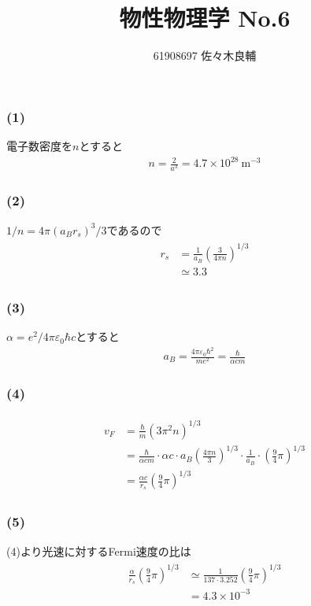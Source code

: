 \documentclass[uplatex,a4j,11pt,dvipdfmx]{jsarticle}
\begin{document}
\title{物性物理学 No.6}
\author{61908697 佐々木良輔}
\date{}
\maketitle
\subsubsection*{(1)}
電子数密度を$n$とすると
\begin{align}
  n=\frac{2}{a^3}=4.7\times10^{28}\ \si{\metre^{-3}}
\end{align}
\subsubsection*{(2)}
$1/n=4\pi(a_Br_s)^3/3$であるので
\begin{align}
  \begin{split}
    r_s&=\frac{1}{a_B}\left(\frac{3}{4\pi n}\right)^{1/3}\\
    &\simeq 3.3
  \end{split}
\end{align}
\subsubsection*{(3)}
$\alpha=e^2/4\pi\varepsilon_0\hbar c$とすると
\begin{align}
  a_B=\frac{4\pi\varepsilon_0\hbar^2}{me^2}=\frac{\hbar}{\alpha cm}
\end{align}
\subsubsection*{(4)}
\begin{align}
  \begin{split}
    v_F&=\frac{\hbar}{m}(3\pi^2n)^{1/3}\\
    &=\frac{\hbar}{\alpha cm}\cdot\alpha c\cdot a_B\left(\frac{4\pi n}{3}\right)^{1/3}\cdot\frac{1}{a_B}\cdot\left(\frac{9}{4}\pi\right)^{1/3}\\
    &=\frac{\alpha c}{r_s}\left(\frac{9}{4}\pi\right)^{1/3}
  \end{split}
\end{align}
\subsubsection*{(5)}
(4)より光速に対するFermi速度の比は
\begin{align}
  \begin{split}
    \frac{\alpha}{r_s}\left(\frac{9}{4}\pi\right)^{1/3}&\simeq\frac{1}{137\cdot3.252}\left(\frac{9}{4}\pi\right)^{1/3}\\
    &=4.3\times10^{-3}
  \end{split}
\end{align}
\end{document}
